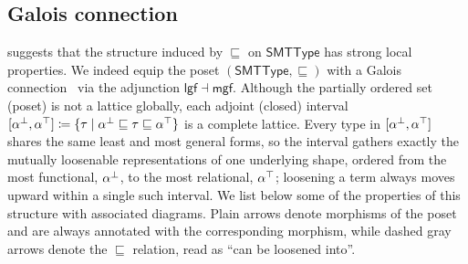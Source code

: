 \begin{example}
\begin{center}
  \end{center}
  \label{fig:loosening-hasse}
\end{example}

\subsection{Galois connection}
 suggests that the structure induced by $\sqsubseteq$ on $\mathsf{SMTType}$ has strong local properties.
We indeed equip the poset $(\mathsf{SMTType},\sqsubseteq)$ with a Galois connection~\cite{davey-priestley} via the adjunction $\mathsf{lgf} \dashv \mathsf{mgf}$.
Although the partially ordered set (poset) is not a lattice globally, each adjoint (closed) interval $[{\alpha}^{\bot}, {\alpha}^{\top}] \coloneq \{ \tau \mid {\alpha}^{\bot} \sqsubseteq \tau \sqsubseteq {\alpha}^{\top} \}$ is a complete lattice.
Every type in $[{\alpha}^{\bot}, {\alpha}^{\top}]$ shares the same least and most general forms, so the interval gathers exactly the mutually loosenable representations of one underlying shape, ordered from the most functional, ${\alpha}^{\bot}$, to the most relational, ${\alpha}^{\top}$; loosening a term always moves upward within a single such interval.
We list below some of the properties of this structure with associated diagrams.
Plain arrows {} denote morphisms of the poset and are always annotated with the corresponding morphism, while dashed gray arrows {} denote the $\sqsubseteq$ relation, read as ``can be loosened into''.


